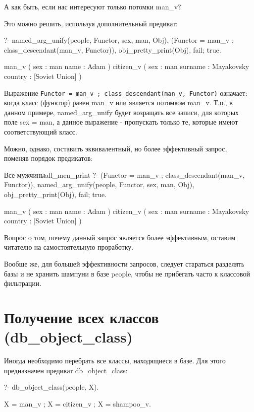 \documentclass[a4paper]{book}
\begin{document}
А как быть, если нас интересуют только потомки man\_v?

Это можно решить, используя дополнительный предикат:

\begin{example}{}{}
?- named_arg_unify(people, Functor, sex, man, Obj), 
   (Functor = man_v ; class_descendant(man_v, Functor)), 
   obj_pretty_print(Obj), fail; true.

man_v ( 
  sex : man 
  name : Adam 
) 
citizen_v ( 
  sex : man 
  surname : Mayakovsky 
  country : [Soviet Union] 
) 
\end{example}

Выражение
\verb|Functor = man_v ; class_descendant(man_v, Functor)|
означает: когда класс (функтор) равен man\_v или является
потомком man\_v. Т.о., в данном примере, named\_arg\_unify будет
возращать все записи, для которых поле sex = man, а данное
выражение - пропускать только те, которые имеют соответствующий
класс. 

Можно, однако, составить эквивалентный, но более эффективный
запрос, поменяв порядок предикатов:

\begin{example}{Все мужчины}{all_men_print}
?- (Functor = man_v ; class_descendant(man_v, Functor)), 
   named_arg_unify(people, Functor, sex, man, Obj), 
   obj_pretty_print(Obj), fail; true.

man_v ( 
  sex : man 
  name : Adam 
) 
citizen_v ( 
  sex : man 
  surname : Mayakovsky 
  country : [Soviet Union] 
) 
\end{example}

Вопрос о том, почему данный запрос является более эффективным,
оставим читателю на самостоятельную проработку.

Вообще же, для большей эффективности запросов, следует стараться
разделять базы и не хранить шампуни в базе people, чтобы не
прибегать часто к классовой фильтрации.

\section{Получение всех классов (db\_object\_class)}
\label{db_object_class}

Иногда необходимо перебрать все классы, находящиеся в базе. Для
этого предназначен предикат db\_object\_class:

\begin{example}{}{}
?- db_object_class(people, X).

X = man_v ;
X = citizen_v ;
X = shampoo_v.
\end{example}
\end{document}
